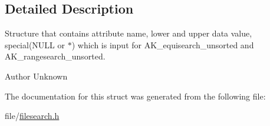 \subsection{Detailed Description}
Structure that contains attribute name, lower and upper data value, special(\+N\+U\+L\+L or $\ast$) which is input for A\+K\+\_\+equisearch\+\_\+unsorted and A\+K\+\_\+rangesearch\+\_\+unsorted. 

\begin{DoxyAuthor}{Author}
Unknown 
\end{DoxyAuthor}


The documentation for this struct was generated from the following file\+:\begin{DoxyCompactItemize}
\item 
file/\hyperlink{filesearch_8h}{filesearch.\+h}\end{DoxyCompactItemize}

